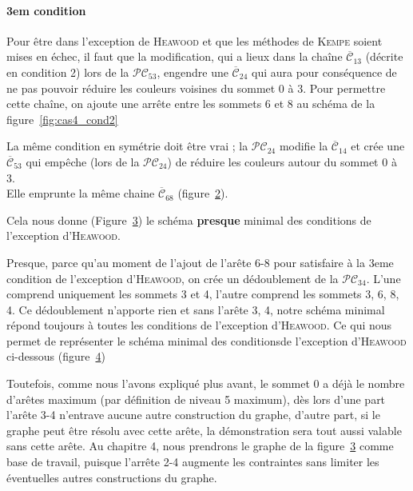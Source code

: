 \documentclass[french]{report}
\begin{document}
\paragraph{3em condition}
Pour être dans l'exception de \textsc{Heawood} et que les méthodes de \textsc{Kempe} soient mises en échec, il faut que la modification, qui a lieux dans la chaîne  $\overline{\mathcal{C}}_{13}$  (décrite en condition 2) lors de la  $\mathcal{PC}_{53}$, engendre une  $\overline{\mathcal{C}}_{24}$ qui aura pour conséquence de ne pas pouvoir réduire les couleurs voisines du sommet 0 à 3.
Pour permettre cette chaîne, on ajoute une arrête entre les sommets 6 et 8 au schéma de la figure~\ref{fig:cas4_cond2}
\begin{figure}[!ht]\centering
		
	\caption{}\label{fig:cas4_cond3_1}
\end{figure}
\FloatBarrier
La même condition en symétrie doit être vrai ; la  $\mathcal{PC}_{24}$ modifie la  $\overline{\mathcal{C}}_{14}$ et crée une  $\overline{\mathcal{C}}_{53}$ qui empêche (lors de la $\mathcal{PC}_{24}$) de réduire les couleurs autour du sommet 0 à 3.\\
Elle emprunte la même chaine  $\overline{\mathcal{C}}_{68}$ (figure~\ref{fig:cas4_cond3_2}).
\begin{figure}[!ht]\centering
		
	\caption{}\label{fig:cas4_cond3_2}
\end{figure}
\FloatBarrier
Cela nous donne (Figure~\ref{fig:cas4_cond3_3}) le schéma \textbf{presque} minimal des conditions de l'exception d'\textsc{Heawood}. 
\begin{figure}[!ht]\centering
		
	\caption{}\label{fig:cas4_cond3_3}
\end{figure}
\FloatBarrier
Presque, parce qu'au moment de l'ajout de l’arête 6-8 pour satisfaire à la 3eme condition de l'exception d'\textsc{Heawood}, on crée un dédoublement de la  $\mathcal{PC}_{34}$. L'une comprend uniquement les sommets 3 et 4, l'autre comprend les sommets 3, 6, 8, 4.
Ce dédoublement n'apporte rien et sans l’arête 3, 4, notre schéma minimal répond toujours à toutes les conditions de l'exception d'\textsc{Heawood}.
Ce qui nous permet de représenter le schéma minimal des conditionsde l'exception d'\textsc{Heawood} ci-dessous (figure~\ref{fig:cas4_cond3_4})
\begin{figure}[!ht]\centering
		
	\caption{}\label{fig:cas4_cond3_4}
\end{figure}
\FloatBarrier
Toutefois, comme nous l'avons expliqué plus avant, le sommet 0 a déjà le nombre d’arêtes maximum (par définition de niveau 5 maximum), dès lors d'une part l’arête 3-4 n'entrave aucune autre construction du graphe, d'autre part, si le graphe peut être résolu avec cette arête, la démonstration sera tout aussi valable sans cette arête. Au chapitre 4, nous prendrons le graphe de la figure~\ref{fig:cas4_cond3_3} comme base de travail, puisque l'arrête 2-4 augmente les contraintes sans limiter les éventuelles autres constructions du graphe.\\
\end{document}
